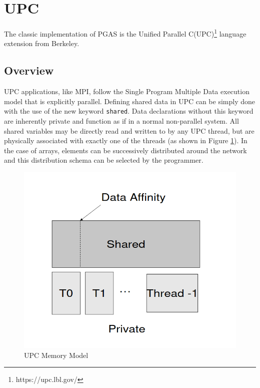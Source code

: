 \section{UPC}
The classic implementation of PGAS is the Unified Parallel C(UPC)\footnote{https://upc.lbl.gov/} language extension from Berkeley. 

\subsection{Overview}

UPC applications, like MPI, follow the Single Program Multiple Data execution model that is explicitly parallel. Defining shared data in UPC can be simply done with the use of the new keyword \verb|shared|. Data declarations without this keyword are inherently private and function as if in a normal non-parallel system. All shared variables may be directly read and written to by any UPC thread, but are physically associated with exactly one of the threads (as shown in Figure \ref{fig:GAS_Diagram}). In the case of arrays, elements can be successively distributed around the network and this distribution schema can be selected by the programmer. 

\begin{figure}[h]
    \centering
    \includegraphics[width=\linewidth]{figures/GAS Diagram.png}
    \caption{UPC Memory Model \cite{UPC_Performance}}
    \label{fig:GAS_Diagram}
\end{figure}

